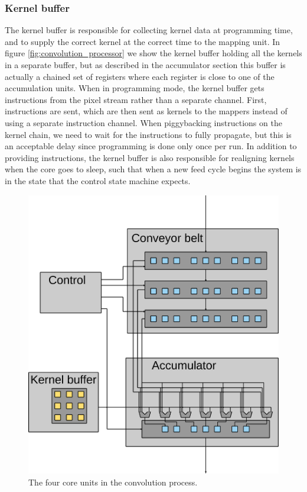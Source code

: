 \subsubsection{Kernel buffer}
The kernel buffer is responsible for collecting kernel data at programming time, and to supply the correct kernel at the correct time to the mapping unit.
In figure \ref{fig:convolution_processor} we show the kernel buffer holding all the kernels in a separate buffer, but as described in the accumulator section this buffer is actually a chained set of registers where each register is close to one of the accumulation units.
When in programming mode, the kernel buffer gets instructions from the pixel stream rather than a separate channel.
First, instructions are sent, which are then sent as kernels to the mappers instead of using a separate instruction channel.
When piggybacking instructions on the kernel chain, we need to wait for the instructions to fully propagate, but this is an acceptable delay since programming is done only once per run.
In addition to providing instructions, the kernel buffer is also responsible for realigning kernels when the core goes to sleep, such that when a new feed cycle begins the system is in the state that the control state machine expects.


\begin{figure}[h!]
    \includegraphics[width=\linewidth]{img/processor_overview_small.png}
    \caption{The four core units in the convolution process.}
    \label{fig:processor_core}
\end{figure}

